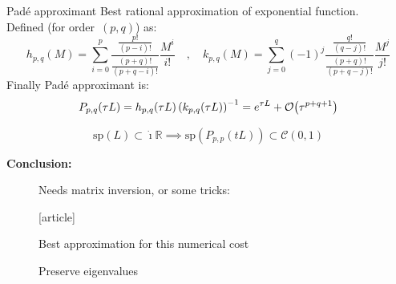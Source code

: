 \documentclass{beamer}
\newcommand{\cmark}{{\color{dgreen}\ding{52}}}
\newcommand{\xmark}{{\color{red}\ding{55}}}
\newcommand{\mbold}[1]{{\textbf{\color{PLB}#1}}}
\newcommand{\I}{\dot{\imath}}
\newcommand{\customcite}[1]{\cite{#1}}
\begin{document}
\begin{frame}{Padé approximant}
  Best rational approximation of exponential function. \\
  Defined (for order~$(p,q)$) as:
  $$
      h_{p,q}(M) = \sum_{i=0}^p        \frac{\frac{p!}{(p-i)!}}{\frac{(p+q)!}{(p+q-i)!}} \frac{M^i}{i!} \quad,\quad
      k_{p,q}(M) = \sum_{j=0}^q (-1)^j \frac{\frac{q!}{(q-j)!}}{\frac{(p+q)!}{(p+q-j)!}} \frac{M^j}{j!}
  $$
  Finally Padé approximant is:
  $$
    P_{p,q}(\tau L) = h_{p,q}(\tau L)\left( k_{p,q}(\tau L) \right)^{-1} = e^{\tau L} + \order{\tau^{p+q+1}}
  $$
  \vspace{-0.5cm}
  \begin{theorem}
    $$\text{sp}(L)\subset\I\mathbb{R} \implies \text{sp}(P_{p,p}(tL))\subset\mathcal{C}(0,1)$$
  \end{theorem}

  \mbold{Conclusion:}
  \begin{description}
    \item[\xmark] Needs matrix inversion, or some tricks:
      \vspace{-0.1cm}
      \begin{thebibliography}{9}
        [article]
         \customcite{Li:2011}
      \end{thebibliography}
    \item[\cmark] Best approximation for this numerical cost
    \item[\cmark] Preserve eigenvalues
  \end{description}
\end{frame}
\end{document}
